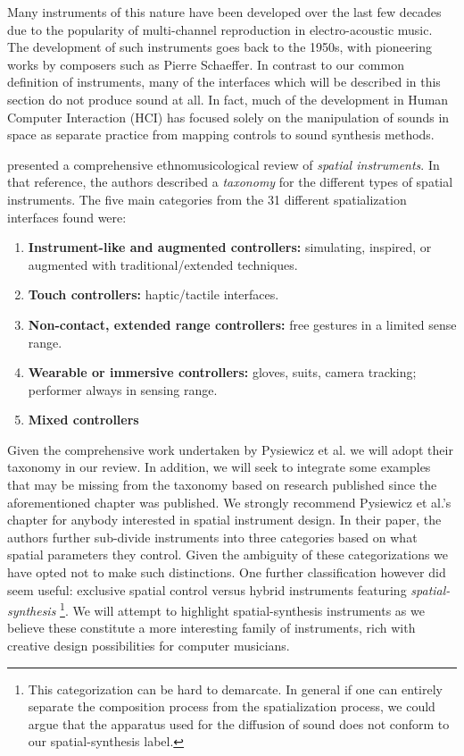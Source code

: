Many instruments of this nature have been developed over the last few decades due to the popularity of multi-channel reproduction in electro-acoustic music. The development of such instruments goes back to the 1950s, with pioneering works by composers such as Pierre Schaeffer. In contrast to our common definition of instruments, many of the interfaces which will be described in this section do not produce sound at all. In fact, much of the development in Human Computer Interaction (HCI) has focused solely on the manipulation of sounds in space as separate practice from mapping controls to sound synthesis methods.  

\cite{pysiewicz2017instruments} presented a comprehensive ethnomusicological review of \textit{spatial instruments}. In that reference, the authors described a \textit{taxonomy} for the different types of spatial instruments. The five main categories from the 31 different spatialization interfaces found were: 

\begin{enumerate}
    \item \textbf{Instrument-like and augmented controllers:} simulating, inspired, or augmented with traditional/extended techniques. 
    \item \textbf{Touch controllers:} haptic/tactile interfaces.
    \item \textbf{Non-contact, extended range controllers:} free gestures in a limited sense range. 
    \item \textbf{Wearable or immersive controllers:} gloves, suits, camera tracking; performer always in sensing range.
    \item \textbf{Mixed controllers}
\end{enumerate}

Given the comprehensive work undertaken by Pysiewicz et al. we will adopt their taxonomy in our review. In addition, we will seek to integrate some examples that may be missing from the taxonomy based on research published since the aforementioned chapter was published. We strongly recommend Pysiewicz et al.'s chapter for anybody interested in spatial instrument design. In their paper, the authors further sub-divide instruments into three categories based on what spatial parameters they control. Given the ambiguity of these categorizations we have opted not to make such distinctions. One further classification however did seem useful: exclusive spatial control versus hybrid instruments featuring \textit{spatial-synthesis} \footnote{This categorization can be hard to demarcate. In general if one can entirely separate the composition process from the spatialization process, we could argue that the apparatus used for the diffusion of sound does not conform to our spatial-synthesis label.}. We will attempt to highlight spatial-synthesis instruments as we believe these constitute a more interesting family of instruments, rich with creative design possibilities for computer musicians.

